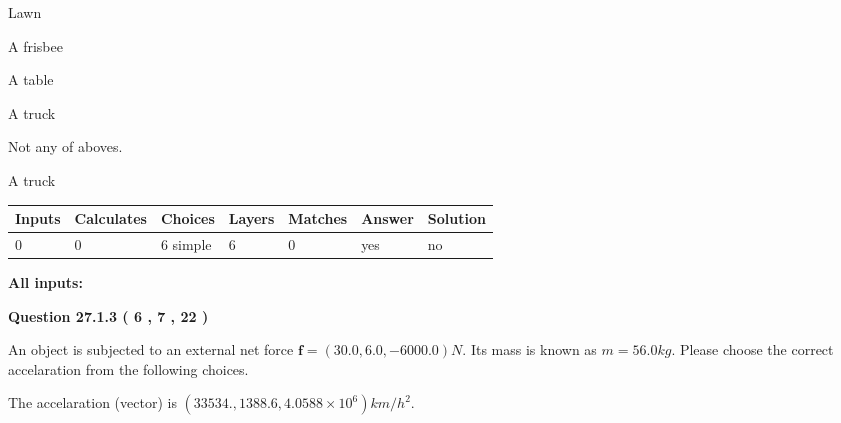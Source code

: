 \documentclass[12pt]{article}
\begin{document}
 
Lawn
 
 
A frisbee
 
 
A table
 
 
A truck
 
 
  Not any of aboves.
 
 
\noindent{}
 
 
A truck
 
 
\noindent{}
 
 
 
\vspace{0.3in}
   
   
   
   
\noindent\begin{tabular}{|l|l|l|l|l|l|l|}
 \hline
Inputs & Calculates & Choices & Layers & Matches & Answer & Solution \\ \hline
           0  & 
           0  & 
           6
  simple  
  & 
           6  & 
           0  & 
  yes & 
  no 
  \\ \hline
 \end{tabular}
   
   
   
   
\noindent{}
   
   
   
   
\noindent\vspace{0.1in}\hspace{-0.08in} {\textbf{\Large{All inputs: }}}
   
   
  
\vspace{0.2in}
  
{\textbf{\Large{Question
27.1.3 
 (           6 ,           7 ,          22 )
}}}
  
  
 
An object is subjected to an external net force $\mathbf{f}=(
30.0 ,
6.0,
-6000.0  )N$. Its mass is known as
$m= %
56.0  kg$. Please choose the correct accelaration
from the following choices.
 
 
 
The accelaration (vector) is
$(
33534.,
1388.6 ,
4.0588 \times 10^{6}
)km/h^2.
$
 
\end{document}
